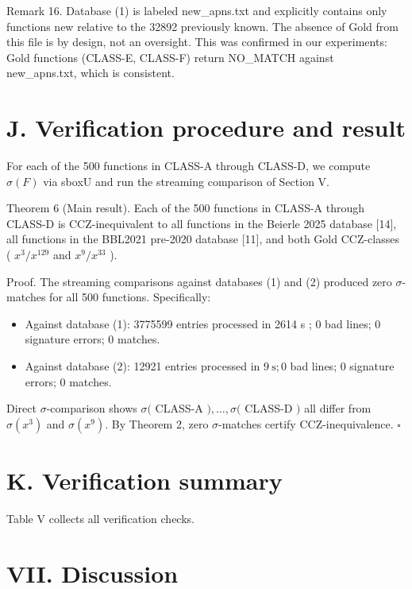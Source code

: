 \documentclass[10pt]{article}
\begin{document}
Remark 16. Database (1) is labeled new\_apns.txt and explicitly contains only functions new relative to the 32892 previously known. The absence of Gold from this file is by design, not an oversight. This was confirmed in our experiments: Gold functions (CLASS-E, CLASS-F) return NO\_MATCH against new\_apns.txt, which is consistent.

\section*{J. Verification procedure and result}
For each of the 500 functions in CLASS-A through CLASS-D, we compute $\sigma(F)$ via sboxU and run the streaming comparison of Section V.

Theorem 6 (Main result). Each of the 500 functions in CLASS-A through CLASS-D is CCZ-inequivalent to all functions in the Beierle 2025 database [14], all functions in the BBL2021 pre-2020 database [11], and both Gold CCZ-classes ( $x^{3} / x^{129}$ and $x^{9} / x^{33}$ ).

Proof. The streaming comparisons against databases (1) and (2) produced zero $\sigma$-matches for all 500 functions. Specifically:

\begin{itemize}
  \item Against database (1): 3775599 entries processed in 2614 s ; 0 bad lines; 0 signature errors; 0 matches.
  \item Against database (2): 12921 entries processed in $9 \mathrm{~s} ; 0$ bad lines; 0 signature errors; 0 matches.
\end{itemize}

Direct $\sigma$-comparison shows $\sigma($ CLASS-A $), \ldots, \sigma($ CLASS-D $)$ all differ from $\sigma\left(x^{3}\right)$ and $\sigma\left(x^{9}\right)$. By Theorem 2, zero $\sigma$-matches certify CCZ-inequivalence. \(\square\)

\section*{K. Verification summary}
Table V collects all verification checks.

\section*{VII. Discussion}
\end{document}
